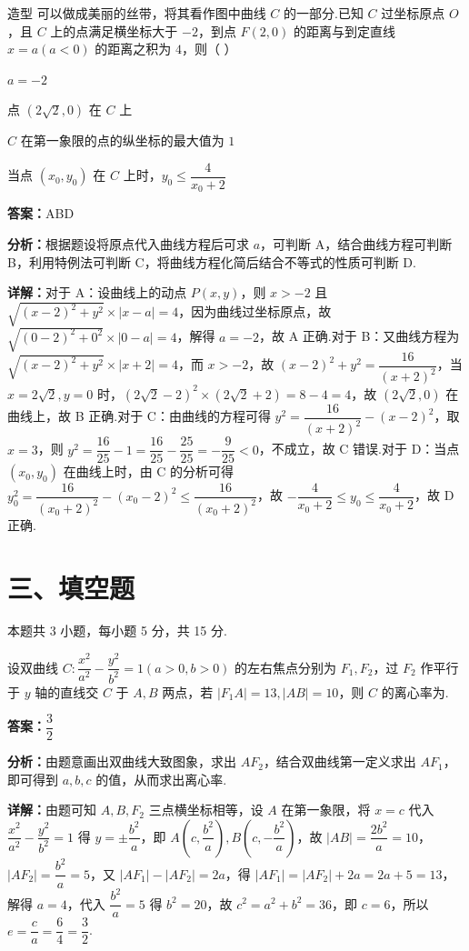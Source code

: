 \begin{question}[points=6]
造型 可以做成美丽的丝带，将其看作图中曲线 $C$ 的一部分.已知 $C$ 过坐标原点 $O$，且 $C$ 上的点满足横坐标大于 $-2$，到点 $F(2,0)$ 的距离与到定直线 $x=a(a<0)$ 的距离之积为 $4$，则（ ）
\begin{choices}
  \item $a=-2$
  \item 点 $(2\sqrt{2},0)$ 在 $C$ 上
  \item $C$ 在第一象限的点的纵坐标的最大值为 $1$
  \item 当点 $(x_0,y_0)$ 在 $C$ 上时，$y_0\le \dfrac{4}{x_0+2}$
\end{choices}
\begin{solution}
\textbf{答案：}ABD

\textbf{分析：}根据题设将原点代入曲线方程后可求 $a$，可判断 A，结合曲线方程可判断 B，利用特例法可判断 C，将曲线方程化简后结合不等式的性质可判断 D.

\textbf{详解：}对于 A：设曲线上的动点 $P(x,y)$，则 $x>-2$ 且 $\sqrt{(x-2)^2+y^2}\times|x-a|=4$，因为曲线过坐标原点，故 $\sqrt{(0-2)^2+0^2}\times|0-a|=4$，解得 $a=-2$，故 A 正确.对于 B：又曲线方程为 $\sqrt{(x-2)^2+y^2}\times|x+2|=4$，而 $x>-2$，故 $(x-2)^2+y^2=\dfrac{16}{(x+2)^2}$，当 $x=2\sqrt{2},y=0$ 时，$(2\sqrt{2}-2)^2\times(2\sqrt{2}+2)=8-4=4$，故 $(2\sqrt{2},0)$ 在曲线上，故 B 正确.对于 C：由曲线的方程可得 $y^2=\dfrac{16}{(x+2)^2}-(x-2)^2$，取 $x=3$，则 $y^2=\dfrac{16}{25}-1=\dfrac{16}{25}-\dfrac{25}{25}=-\dfrac{9}{25}<0$，不成立，故 C 错误.对于 D：当点 $(x_0,y_0)$ 在曲线上时，由 C 的分析可得 $y_0^2=\dfrac{16}{(x_0+2)^2}-(x_0-2)^2\le \dfrac{16}{(x_0+2)^2}$，故 $-\dfrac{4}{x_0+2}\le y_0\le \dfrac{4}{x_0+2}$，故 D 正确.
\end{solution}
\end{question}

\section*{三、填空题}
本题共 3 小题，每小题 5 分，共 15 分.

\begin{question}[points=5]
设双曲线 $C:\dfrac{x^2}{a^2}-\dfrac{y^2}{b^2}=1(a>0,b>0)$ 的左右焦点分别为 $F_1,F_2$，过 $F_2$ 作平行于 $y$ 轴的直线交 $C$ 于 $A,B$ 两点，若 $|F_1A|=13,|AB|=10$，则 $C$ 的离心率为.
\fillin[{$\dfrac{3}{2}$}]
\begin{solution}
\textbf{答案：}$\dfrac{3}{2}$

\textbf{分析：}由题意画出双曲线大致图象，求出 $AF_2$，结合双曲线第一定义求出 $AF_1$，即可得到 $a,b,c$ 的值，从而求出离心率.

\textbf{详解：}由题可知 $A,B,F_2$ 三点横坐标相等，设 $A$ 在第一象限，将 $x=c$ 代入 $\dfrac{x^2}{a^2}-\dfrac{y^2}{b^2}=1$ 得 $y=\pm\dfrac{b^2}{a}$，即 $A\left(c,\dfrac{b^2}{a}\right),B\left(c,-\dfrac{b^2}{a}\right)$，故 $|AB|=\dfrac{2b^2}{a}=10$，$|AF_2|=\dfrac{b^2}{a}=5$，又 $|AF_1|-|AF_2|=2a$，得 $|AF_1|=|AF_2|+2a=2a+5=13$，解得 $a=4$，代入 $\dfrac{b^2}{a}=5$ 得 $b^2=20$，故 $c^2=a^2+b^2=36$，即 $c=6$，所以 $e=\dfrac{c}{a}=\dfrac{6}{4}=\dfrac{3}{2}$.
\end{solution}
\end{question}

